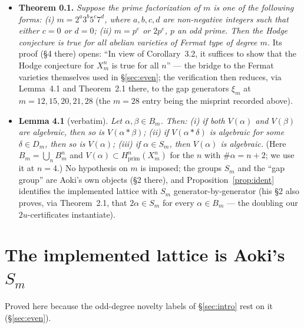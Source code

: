 \documentclass[11pt]{amsart}
\theoremstyle{remark}
\newcommand{\V}{V}
\begin{document}
\begin{itemize}
\item[--] \textbf{Theorem 0.1.} \emph{Suppose the prime factorization of $m$ is one of the
following forms: (i) $m=2^a3^b5^c7^d$, where $a,b,c,d$ are non-negative integers such that either
$c=0$ or $d=0$; (ii) $m=p^e$ or $2p^e$, $p$ an odd prime. Then the Hodge conjecture is true for
all abelian varieties of Fermat type of degree $m$.} Its proof (\S4 there) opens: ``In view of
Corollary~3.2, it suffices to show that the Hodge conjecture for $X^n_m$ is true for all $n$'' ---
the bridge to the Fermat varieties themselves used in \S\ref{sec:even}; the
verification then reduces, via Lemma~4.1 and Theorem~2.1 there, to the gap generators $\xi_m$ at
$m=12,15,20,21,28$ (the $m=28$ entry being the misprint recorded above).
\item[--] \textbf{Lemma 4.1} (verbatim). \emph{Let $\alpha,\beta\in B_m$. Then:
(i) if both $\V(\alpha)$ and $\V(\beta)$ are algebraic, then so is $\V(\alpha*\beta)$;
(ii) if $\V(\alpha*\delta)$ is algebraic for some $\delta\in D_m$, then so is $\V(\alpha)$;
(iii) if $\alpha\in S_m$, then $\V(\alpha)$ is algebraic.} (Here $B_m=\bigcup_nB^n_m$ and
$\V(\alpha)\subset H^n_{\mathrm{prim}}(X^n_m)$ for the $n$ with $\#\alpha=n+2$; we use it at
$n=4$.) No hypothesis on $m$ is imposed; the
groups $S_m$ and the ``gap group'' are Aoki's own objects (\S2 there), and
Proposition~\ref{prop:ident} identifies the implemented lattice with $S_m$
generator-by-generator (his \S2 also proves, via Theorem~2.1, that $2\alpha\in S_m$ for every
$\alpha\in B_m$ --- the doubling our $2u$-certificates instantiate).
\end{itemize}

\section{\texorpdfstring{The implemented lattice is Aoki's $S_m$}{The implemented lattice is Aoki's S\_m}}\label{app:ident}

Proved here because the odd-degree novelty labels of \S\ref{sec:intro} rest on it (\S\ref{sec:even}).
\end{document}

